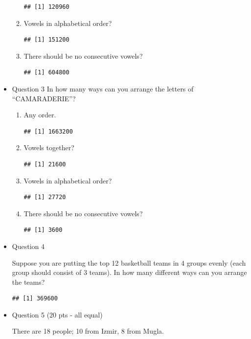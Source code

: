 \documentclass[]{book}
\theoremstyle{definition}
\theoremstyle{definition}
\theoremstyle{definition}
\theoremstyle{remark}
\begin{document}
\begin{itemize}
\begin{enumerate}
\begin{verbatim}
## [1] 120960
\end{verbatim}
  \item
    Vowels in alphabetical order?

\begin{verbatim}
## [1] 151200
\end{verbatim}
  \item
    There should be no consecutive vowels?

\begin{verbatim}
## [1] 604800
\end{verbatim}
  \end{enumerate}
\item
  Question 3 In how many ways can you arrange the letters of
  ``CAMARADERIE''?

  \begin{enumerate}
  \def\labelenumi{\alph{enumi})}
  \item
    Any order.

\begin{verbatim}
## [1] 1663200
\end{verbatim}
  \item
    Vowels together?

\begin{verbatim}
## [1] 21600
\end{verbatim}
  \item
    Vowels in alphabetical order?

\begin{verbatim}
## [1] 27720
\end{verbatim}
  \item
    There should be no consecutive vowels?

\begin{verbatim}
## [1] 3600
\end{verbatim}
  \end{enumerate}
\item
  Question 4

  Suppose you are putting the top 12 basketball teams in 4 groups evenly
  (each group should consist of 3 teams). In how many different ways can
  you arrange the teams?

\begin{verbatim}
## [1] 369600
\end{verbatim}
\item
  Question 5 (20 pts - all equal)

  There are 18 people; 10 from Izmir, 8 from Mugla.


\end{itemize}
\end{document}
